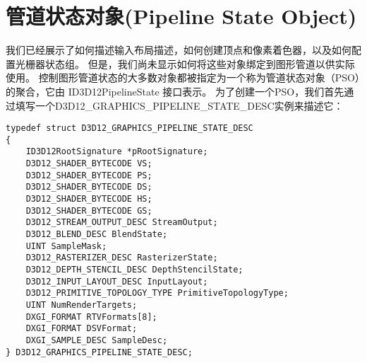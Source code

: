 \section{管道状态对象(Pipeline State Object)}
\begin{flushleft}
我们已经展示了如何描述输入布局描述，如何创建顶点和像素着色器，以及如何配置光栅器状态组。 但是，我们尚未显示如何将这些对象绑定到图形管道以供实际使用。 控制图形管道状态的大多数对象都被指定为一个称为管道状态对象（PSO）的聚合，它由 ID3D12PipelineState 接口表示。 为了创建一个PSO，我们首先通过填写一个D3D12\_GRAPHICS\_PIPELINE\_STATE\_DESC实例来描述它：\\
\end{flushleft}
\begin{lstlisting}
typedef struct D3D12_GRAPHICS_PIPELINE_STATE_DESC
{
    ID3D12RootSignature *pRootSignature;
    D3D12_SHADER_BYTECODE VS;
    D3D12_SHADER_BYTECODE PS;
    D3D12_SHADER_BYTECODE DS;
    D3D12_SHADER_BYTECODE HS;
    D3D12_SHADER_BYTECODE GS;
    D3D12_STREAM_OUTPUT_DESC StreamOutput;
    D3D12_BLEND_DESC BlendState;
    UINT SampleMask;
    D3D12_RASTERIZER_DESC RasterizerState;
    D3D12_DEPTH_STENCIL_DESC DepthStencilState;
    D3D12_INPUT_LAYOUT_DESC InputLayout;
    D3D12_PRIMITIVE_TOPOLOGY_TYPE PrimitiveTopologyType;
    UINT NumRenderTargets;
    DXGI_FORMAT RTVFormats[8];
    DXGI_FORMAT DSVFormat;
    DXGI_SAMPLE_DESC SampleDesc;
} D3D12_GRAPHICS_PIPELINE_STATE_DESC;
\end{lstlisting}
